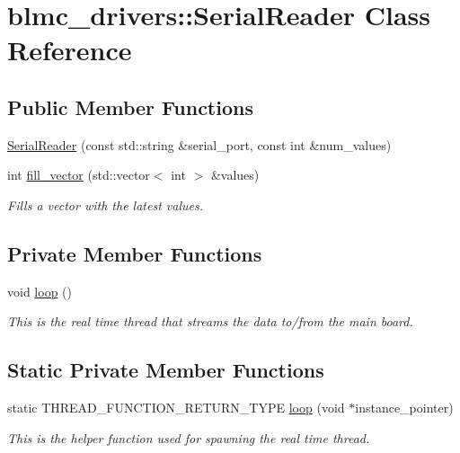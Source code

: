 \hypertarget{classblmc__drivers_1_1SerialReader}{}\section{blmc\+\_\+drivers\+:\+:Serial\+Reader Class Reference}
\label{classblmc__drivers_1_1SerialReader}
\subsection*{Public Member Functions}
\begin{DoxyCompactItemize}
\item 
\hyperlink{classblmc__drivers_1_1SerialReader_a894216b6799b0ea9945f8a1cf98f9801}{Serial\+Reader} (const std\+::string \&serial\+\_\+port, const int \&num\+\_\+values)
\item 
int \hyperlink{classblmc__drivers_1_1SerialReader_aa590c82f97cfa6d9222bc3d19952f166}{fill\+\_\+vector} (std\+::vector$<$ int $>$ \&values)
\begin{DoxyCompactList}\small\item\em Fills a vector with the latest values. \end{DoxyCompactList}\end{DoxyCompactItemize}
\subsection*{Private Member Functions}
\begin{DoxyCompactItemize}
\item 
void \hyperlink{classblmc__drivers_1_1SerialReader_a24a8f28fa8e56934baa1d0b9fef7a045}{loop} ()\hypertarget{classblmc__drivers_1_1SerialReader_a24a8f28fa8e56934baa1d0b9fef7a045}{}\label{classblmc__drivers_1_1SerialReader_a24a8f28fa8e56934baa1d0b9fef7a045}

\begin{DoxyCompactList}\small\item\em This is the real time thread that streams the data to/from the main board. \end{DoxyCompactList}\end{DoxyCompactItemize}
\subsection*{Static Private Member Functions}
\begin{DoxyCompactItemize}
\item 
static T\+H\+R\+E\+A\+D\+\_\+\+F\+U\+N\+C\+T\+I\+O\+N\+\_\+\+R\+E\+T\+U\+R\+N\+\_\+\+T\+Y\+PE \hyperlink{classblmc__drivers_1_1SerialReader_aaa18311d9c274b0ac8a8bd86a311d3fc}{loop} (void $\ast$instance\+\_\+pointer)
\begin{DoxyCompactList}\small\item\em This is the helper function used for spawning the real time thread. \end{DoxyCompactList}\end{DoxyCompactItemize}
